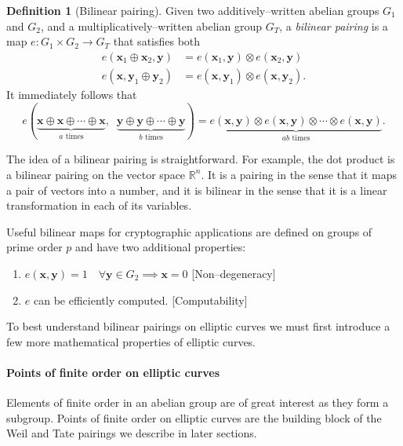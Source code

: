 \documentclass[9pt]{article}
\theoremstyle{definition}
\newtheorem{definition}{Definition}[section]
\begin{document}
\begin{definition}[Bilinear pairing]
Given two additively--written abelian groups $G_1$ and $G_2$, and a multiplicatively--written abelian group $G_T$, a \textit{bilinear pairing} is a map $e: G_1 \times G_2 \to G_T$ that satisfies both
\begin{align*}
    e(\mathbf{x}_1 \oplus \mathbf{x}_2, \mathbf{y}) &= e(\mathbf{x}_1, \mathbf{y}) \otimes e(\mathbf{x}_2, \mathbf{y})\\
    e(\mathbf{x}, \mathbf{y}_1 \oplus \mathbf{y}_2) &= e(\mathbf{x}, \mathbf{y}_1) \otimes e(\mathbf{x}, \mathbf{y}_2).
\end{align*}
It immediately follows that
$$e(\underbrace{\mathbf{x} \oplus \mathbf{x} \oplus \cdots \oplus \mathbf{x}}_{a\text{ times}},\;\; \underbrace{\mathbf{y} \oplus \mathbf{y} \oplus \cdots \oplus \mathbf{y}}_{b\text{ times}}) = \underbrace{e(\mathbf{x}, \mathbf{y}) \otimes e(\mathbf{x}, \mathbf{y}) \otimes \cdots \otimes e(\mathbf{x}, \mathbf{y})}_{ab\text{ times}}.$$
\end{definition}

The idea of a bilinear pairing is straightforward. For example, the dot product is a bilinear pairing on the vector space $\mathbb{R}^n$. It is a pairing in the sense that it maps a pair of vectors into a number, and it is bilinear in the sense that it is a linear transformation in each of its variables.

Useful bilinear maps for cryptographic applications are defined on groups of prime order $p$ and have two additional properties:
\begin{enumerate}[label=(\textit{\roman*})]
    \item $e(\mathbf{x}, \mathbf{y}) = 1 \quad \forall \mathbf{y} \in G_2 \implies \mathbf{x} = 0$ \hfill [Non--degeneracy]
    \item $e$ can be efficiently computed. \hfill [Computability]
\end{enumerate}

To best understand bilinear pairings on elliptic curves we must first introduce a few more mathematical properties of elliptic curves.

\paragraph{Points of finite order on elliptic curves}
Elements of finite order in an abelian group are of great interest as they form a subgroup. Points of finite order on elliptic curves are the building block of the Weil and Tate pairings we describe in later sections.
\end{document}

